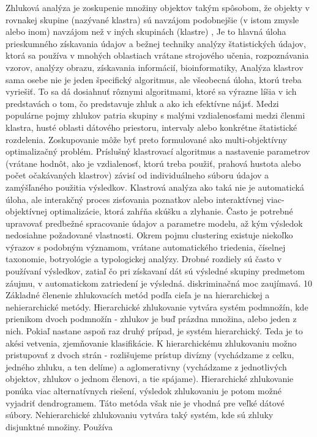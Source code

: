 Zhluková analýza je zoskupenie množiny objektov takým spôsobom, že objekty v rovnakej
skupine (nazývané klastra) sú navzájom podobnejšie (v istom zmysle alebo inom) navzájom
než v iných skupinách (klastre) , Je to hlavná úloha prieskumného získavania údajov a bežnej
techniky analýzy štatistických údajov, ktorá sa používa v mnohých oblastiach vrátane
strojového učenia, rozpoznávania vzorov, analýzy obrazu, získavania informácií,
bioinformatiky,
Analýza klastrov sama osebe nie je jeden špecifický algoritmus, ale všeobecná úloha, ktorú
treba vyriešiť. To sa dá dosiahnuť rôznymi algoritmami, ktoré sa výrazne líšia v ich
predstavách o tom, čo predstavuje zhluk a ako ich efektívne nájsť. Medzi populárne pojmy
zhlukov patria skupiny s malými vzdialenosťami medzi členmi klastra, husté oblasti dátového
priestoru, intervaly alebo konkrétne štatistické rozdelenia. Zoskupovanie môže byť preto
formulované ako multi-objektívny optimalizačný problém. Príslušný klastrovací algoritmus a
nastavenie parametrov (vrátane hodnôt, ako je vzdialenosť, ktorú treba použiť, prahová
hustota alebo počet očakávaných klastrov) závisí od individuálneho súboru údajov a
zamýšľaného použitia výsledkov. Klastrová analýza ako taká nie je automatická úloha, ale
interakčný proces zisťovania poznatkov alebo interaktívnej viac-objektívnej optimalizácie,
ktorá zahŕňa skúšku a zlyhanie. Často je potrebné upravovať predbežné spracovanie údajov a
parametre modelu, až kým výsledok nedosiahne požadované vlastnosti.
Okrem pojmu clustering existuje niekoľko výrazov s podobným významom, vrátane
automatického triedenia, číselnej taxonomie, botryológie a
typologickej analýzy. Drobné rozdiely sú často v používaní výsledkov, zatiaľ čo pri získavaní
dát sú výsledné skupiny predmetom záujmu, v automatickom zatriedení je výsledná.
diskriminačná moc zaujímavá.
10
Základné členenie zhlukovacích metód podľa cieľa je na hierarchickej a nehierarchické
metódy.
Hierarchické zhlukovanie vytvára systém podmnožín, kde prienikom dvoch podmnožín -
zhlukov je buď prázdna množina, alebo jeden z nich. Pokiaľ nastane aspoň raz druhý prípad,
je systém hierarchický. Teda je to akési vetvenia, zjemňovanie klasifikácie. K hierarchickému
zhlukovaniu možno pristupovať z dvoch strán - rozlišujeme prístup divízny (vychádzame z
celku, jedného zhluku, a ten delíme) a aglomerativny (vychádzame z jednotlivých objektov,
zhlukov o jednom členovi, a tie spájame). Hierarchické zhlukovanie ponúka viac
alternatívnych riešení, výsledok zhlukovaniu je potom možné vyjadriť dendrogramem. Táto
metóda však nie je vhodná pre veľké dátové súbory.
Nehierarchické zhlukovaniu vytvára taký systém, kde sú zhluky disjunktné množiny. Používa
